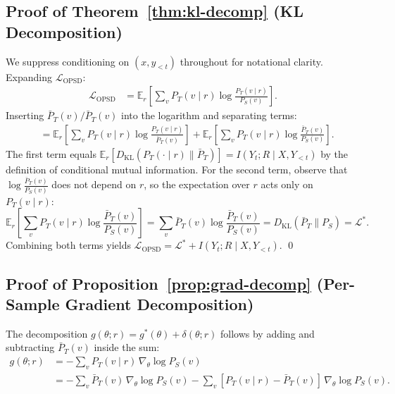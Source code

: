 \documentclass[]{jingdong}
\begin{document}
\subsection{Proof of Theorem~\ref{thm:kl-decomp} (KL Decomposition)}
\label{app:proof-kl-decomp}

We suppress conditioning on $(x, y_{<t})$ throughout for notational clarity. Expanding $\mathcal{L}_{\text{OPSD}}$:
\begin{align}
    \mathcal{L}_{\text{OPSD}} 
    &= \mathbb{E}_r\!\left[\sum_v P_T(v \mid r) \log \frac{P_T(v \mid r)}{P_S(v)}\right].
\end{align}
Inserting $\bar{P}_T(v) / \bar{P}_T(v)$ into the logarithm and separating terms:
\begin{align}
    &= \mathbb{E}_r\!\left[\sum_v P_T(v \mid r) \log \frac{P_T(v \mid r)}{\bar{P}_T(v)}\right] + \mathbb{E}_r\!\left[\sum_v P_T(v \mid r) \log \frac{\bar{P}_T(v)}{P_S(v)}\right].
\end{align}
The first term equals $\mathbb{E}_r[D_{\mathrm{KL}}(P_T(\cdot \mid r) \| \bar{P}_T)] = I(Y_t; R \mid X, Y_{<t})$ by the definition of conditional mutual information. For the second term, observe that $\log \frac{\bar{P}_T(v)}{P_S(v)}$ does not depend on $r$, so the expectation over $r$ acts only on $P_T(v \mid r)$:
\begin{equation}
    \mathbb{E}_r\!\left[\sum_v P_T(v \mid r) \log \frac{\bar{P}_T(v)}{P_S(v)}\right] = \sum_v \bar{P}_T(v) \log \frac{\bar{P}_T(v)}{P_S(v)} = D_{\mathrm{KL}}(\bar{P}_T \| P_S) = \mathcal{L}^*.
\end{equation}
Combining both terms yields $\mathcal{L}_{\text{OPSD}} = \mathcal{L}^* + I(Y_t; R \mid X, Y_{<t})$. \qed


\subsection{Proof of Proposition~\ref{prop:grad-decomp} (Per-Sample Gradient Decomposition)}
\label{app:proof-grad-decomp}

The decomposition $g(\theta; r) = g^*(\theta) + \delta(\theta; r)$ follows by adding and subtracting $\bar{P}_T(v)$ inside the sum:
\begin{align}
    g(\theta; r) &= -\sum_{v} P_T(v \mid r)\, \nabla_\theta \log P_S(v) \nonumber \\
    &= -\sum_{v} \bar{P}_T(v)\, \nabla_\theta \log P_S(v) - \sum_{v} [P_T(v \mid r) - \bar{P}_T(v)]\, \nabla_\theta \log P_S(v).
\end{align}
\end{document}
